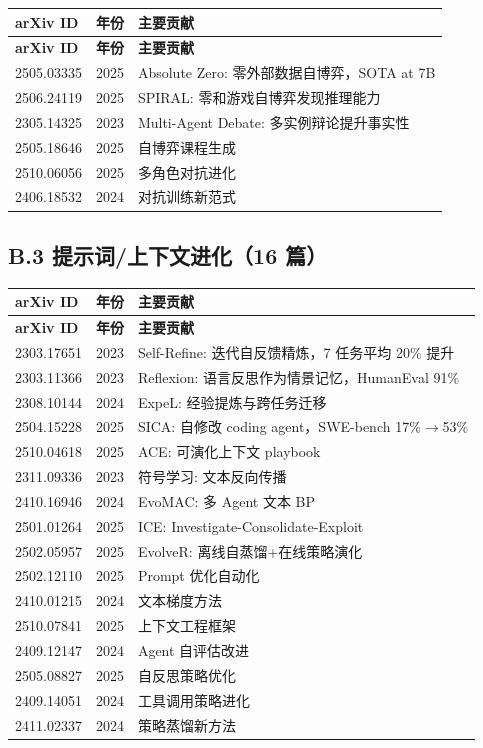 \begin{longtable}{llp{7cm}}
\toprule
\textbf{arXiv ID} & \textbf{年份} & \textbf{主要贡献} \\
\midrule
\endfirsthead
\toprule
\textbf{arXiv ID} & \textbf{年份} & \textbf{主要贡献} \\
\midrule
\endhead
\bottomrule
\endlastfoot

2505.03335 & 2025 & Absolute Zero: 零外部数据自博弈，SOTA at 7B \\
2506.24119 & 2025 & SPIRAL: 零和游戏自博弈发现推理能力 \\
2305.14325 & 2023 & Multi-Agent Debate: 多实例辩论提升事实性 \\
2505.18646 & 2025 & 自博弈课程生成 \\
2510.06056 & 2025 & 多角色对抗进化 \\
2406.18532 & 2024 & 对抗训练新范式 \\
\end{longtable}

\subsection*{B.3 提示词/上下文进化（16 篇）}

\begin{longtable}{llp{7cm}}
\toprule
\textbf{arXiv ID} & \textbf{年份} & \textbf{主要贡献} \\
\midrule
\endfirsthead
\toprule
\textbf{arXiv ID} & \textbf{年份} & \textbf{主要贡献} \\
\midrule
\endhead
\bottomrule
\endlastfoot

2303.17651 & 2023 & Self-Refine: 迭代自反馈精炼，7 任务平均 20\% 提升 \\
2303.11366 & 2023 & Reflexion: 语言反思作为情景记忆，HumanEval 91\% \\
2308.10144 & 2024 & ExpeL: 经验提炼与跨任务迁移 \\
2504.15228 & 2025 & SICA: 自修改 coding agent，SWE-bench 17\%$\to$53\% \\
2510.04618 & 2025 & ACE: 可演化上下文 playbook \\
2311.09336 & 2023 & 符号学习: 文本反向传播 \\
2410.16946 & 2024 & EvoMAC: 多 Agent 文本 BP \\
2501.01264 & 2025 & ICE: Investigate-Consolidate-Exploit \\
2502.05957 & 2025 & EvolveR: 离线自蒸馏+在线策略演化 \\
2502.12110 & 2025 & Prompt 优化自动化 \\
2410.01215 & 2024 & 文本梯度方法 \\
2510.07841 & 2025 & 上下文工程框架 \\
2409.12147 & 2024 & Agent 自评估改进 \\
2505.08827 & 2025 & 自反思策略优化 \\
2409.14051 & 2024 & 工具调用策略进化 \\
2411.02337 & 2024 & 策略蒸馏新方法 \\
\end{longtable}


